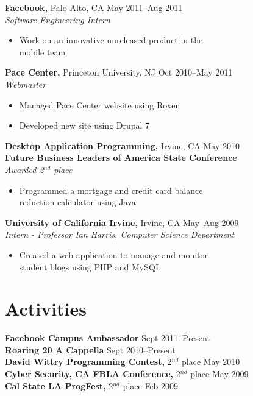 \documentclass[margin]{res}
\begin{document}
\begin{resume}
 {\bf Facebook,} Palo Alto, CA \hfill May 2011--Aug 2011 \\
 {\it Software Engineering Intern}
 \begin{itemize} \itemsep -2pt  %
 \item Work on an innovative unreleased product in the \\
   mobile team
 \end{itemize}

 {\bf Pace Center,} Princeton University, NJ \hfill Oct 2010--May 2011 \\
 {\it Webmaster}
 \begin{itemize} \itemsep -2pt  %
 \item Managed Pace Center website using Roxen
 \item Developed new site using Drupal 7
 \end{itemize}
 
 {\bf Desktop Application Programming,} Irvine, CA \hfill May 2010 \\
 {\bf Future Business Leaders of America State Conference} \\
 {\it Awarded 2$^{nd}$ place}
 \begin{itemize} \itemsep -2pt  %
 \item Programmed a mortgage and credit card balance \\
   reduction calculator using Java
 \end{itemize}

 {\bf University of California Irvine,} Irvine, CA \hfill May--Aug
 2009 \\
 {\it Intern - Professor Ian Harris, Computer Science Department}
 \begin{itemize} \itemsep -2pt  %
 \item Created a web application to manage and monitor \\
   student blogs using PHP and MySQL 
 \end{itemize}


 
\section{Activities}
 {\bf Facebook Campus Ambassador} \hfill Sept 2011--Present \\
 {\bf Roaring 20 A Cappella} \hfill Sept 2010--Present \\
 {\bf David Wittry Programming Contest,} 2$^{nd}$ place \hfill May 2010 \\
 {\bf Cyber Security, CA FBLA Conference,} 2$^{nd}$ place \hfill May 2009 \\
 {\bf Cal State LA ProgFest,} 2$^{nd}$ place \hfill Feb 2009

\end{resume}
\end{document}

